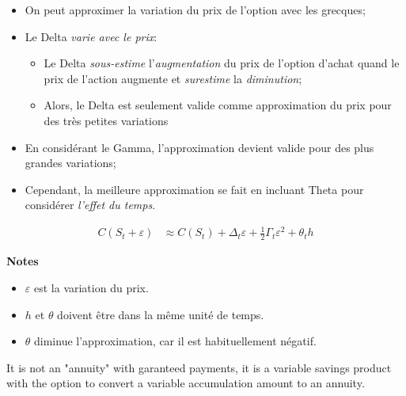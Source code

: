\documentclass[10pt, french]{article}
\begin{document}
\begin{multicols*}{2}
\begin{itemize}[leftmargin = *]
	\item	On peut approximer la variation du prix de l'option avec les grecques;
	\item	Le Delta \textit{varie avec le prix}: 
		\begin{itemize}
		\item	Le Delta \textit{sous-estime} l'\textit{augmentation} du prix de l'option d'achat quand le prix de l'action augmente et \textit{surestime} la \textit{diminution};
		\item	Alors, le Delta est seulement valide comme approximation du prix pour des très petites variations
		\end{itemize}
	\item	En considérant le Gamma, l'approximation devient valide pour des plus grandes variations;
	\item	Cependant, la meilleure approximation se fait en incluant Theta pour considérer \textit{l'effet du temps}.
\end{itemize}

\begin{definitionNOHFILL}
\begin{align*}
	C(S_{t} + \varepsilon)
	&\approx	C(S_{t}) + \Delta_{t} \varepsilon + \frac{1}{2} \Gamma_{t} \varepsilon^{2} + \theta_{t} h
\end{align*}

\tcbline

\textbf{Notes}
\begin{itemize}[leftmargin = *]
	\item	$\varepsilon$ est la variation du prix.
	\item	$h$ et $\theta$ doivent être dans la même unité de temps.
	\item	$\theta$ diminue l'approximation, car il est habituellement négatif.
\end{itemize}
\end{definitionNOHFILL}



\newpage
\begin{definitionNOHFILL}
It is not an "annuity" with garanteed payments, it is a variable savings product with the option to convert a variable accumulation amount to an annuity.\\


\end{definitionNOHFILL}
\end{multicols*}
\end{document}
